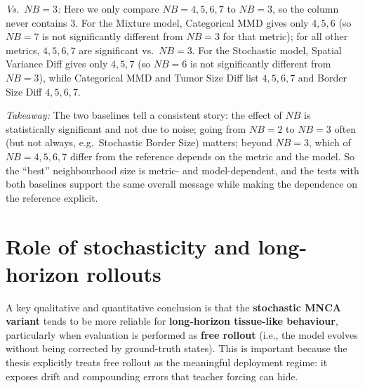 \emph{Vs.\ \(NB=3\):} Here we only compare \(NB=4,5,6,7\) to \(NB=3\), so the column never contains 3.
For the Mixture model, Categorical MMD gives only \(4,5,6\) (so \(NB=7\) is not significantly different from \(NB=3\) for that metric); for all other metrics, \(4,5,6,7\) are significant vs.\ \(NB=3\).
For the Stochastic model, Spatial Variance Diff gives only \(4,5,7\) (so \(NB=6\) is not significantly different from \(NB=3\)), while Categorical MMD and Tumor Size Diff list \(4,5,6,7\) and Border Size Diff \(4,5,6,7\).

\emph{Takeaway:} The two baselines tell a consistent story: the effect of \(NB\) is statistically significant and not due to noise; going from \(NB=2\) to \(NB=3\) often (but not always, e.g.\ Stochastic Border Size) matters; beyond \(NB=3\), which of \(NB=4,5,6,7\) differ from the reference depends on the metric and the model.
So the ``best'' neighbourhood size is metric- and model-dependent, and the tests with both baselines support the same overall message while making the dependence on the reference explicit.

\section{Role of stochasticity and long-horizon rollouts}
\label{sec:results:stochasticity}

A key qualitative and quantitative conclusion is that the \textbf{stochastic MNCA variant} tends to be more reliable for \textbf{long-horizon tissue-like behaviour}, particularly when evaluation is performed as \textbf{free rollout} (i.e., the model evolves without being corrected by ground-truth states).
This is important because the thesis explicitly treats free rollout as the meaningful deployment regime: it exposes drift and compounding errors that teacher forcing can hide.

